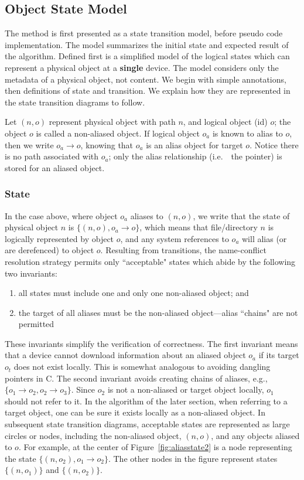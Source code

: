 \subsection*{Object State Model}

The method is first presented as a state transition model, before pseudo code
implementation. The model summarizes the initial state and expected result of the
algorithm. Defined first is a simplified model of the logical states which
can represent a physical object at a {\bf single} device. The model considers
only the metadata of a physical object, not content.
We begin with simple annotations, then definitions of state and transition. We
explain how they are represented in the state transition diagrams to follow.

Let $(n,o)$ represent physical object with path $n$, and logical object (id)
$o$; the object $o$ is called a non-aliased object. If logical object $o_a$ is
known to alias to $o$, then we write $o_a \rightarrow o$, knowing that $o_a$ is
an alias object for target $o$. Notice there is no path associated with $o_a$;
only the alias relationship (i.e.~\ the pointer) is stored for an aliased
object.

\subsubsection*{State}
In the case above, where object $o_a$ aliases to $(n,o)$, we write that the
state of physical object $n$ is $\{(n,o), o_a \rightarrow o\}$, which means that
file/directory $n$ is logically represented by object $o$, and any system
references to $o_a$ will alias (or are derefenced) to object $o$. Resulting from
transitions, the name-conflict resolution strategy permits only ``acceptable"
states which abide by the following two invariants:
\begin{enumerate}
\item all states must include one and only one non-aliased object; and
\item the target of all aliases must be the non-aliased object---alias ``chains"
are not permitted
\end{enumerate}
These invariants simplify the verification of correctness. The first invariant
means that a device cannot download information about an aliased object $o_a$ if
its target $o_t$ does not exist locally. This is somewhat analogous to avoiding
dangling pointers in C. The second invariant avoids creating chains of aliases,
e.g., $\{o_1 \rightarrow o_2, o_2 \rightarrow o_3\}$. Since $o_2$ is not a
non-aliased or target object locally, $o_1$ should not refer to it. In the
algorithm of the later section, when referring to a target object, one can be
sure it exists locally as a non-aliased object. In subsequent state transition
diagrams, acceptable states are represented as large circles or nodes, including
the non-aliased object, $(n,o)$, and any objects aliased to $o$. For example, at
the center of Figure~\ref{fig:aliasstate2} is a node representing the state
$\{(n,o_2), o_1 \rightarrow o_2\}$. The other nodes in the figure represent
states $\{(n,o_1)\}$ and $\{(n,o_2)\}$.

